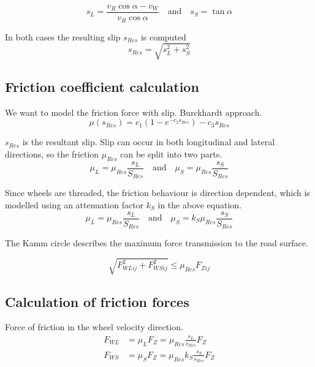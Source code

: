 \begin{equation}
  s_L = \frac{v_R \cos{\alpha} - v_W}{v_R \cos{\alpha}}
  \quad \text{and} \quad
  s_S = \tan{\alpha}
\end{equation}

In both cases the resulting slip $s_{Res}$ is computed 
\begin{equation}
  s_{Res} = \sqrt{s_L^2 + s_S^2}
\end{equation}


\subsection{Friction coefficient calculation}

We want to model the friction force with slip. 
Burckhardt approach.
\begin{equation}
    \mu(s_{Res}) = c_1 \left( 1 - e^{-c_2 s_{Res}} \right) - c_3 s_{Res}
\end{equation}

$s_{Res}$ is the resultant slip. Slip can occur in both longitudinal and lateral directions, so the friction $\mu_{Res}$ can be split into two parts.
\begin{equation}
  \mu_L = \mu_{Res}\frac{s_L}{S_{Res}} 
  \quad \text{and} \quad
  \mu_S = \mu_{Res}\frac{s_S}{S_{Res}} 
\end{equation}

Since wheels are threaded, the friction behaviour is direction dependent, which is modelled using an attenuation factor $k_S$ in the above equation.
\begin{equation}
  \mu_L = \mu_{Res}\frac{s_L}{S_{Res}} 
  \quad \text{and} \quad
  \mu_S = k_S \mu_{Res} \frac{s_S}{S_{Res}} 
\end{equation}

The Kamm circle describes the maximum force transmission to the road surface.

\begin{equation}
  \sqrt{F_{WLij}^2 + F_{WSij}^2} \leq \mu_{Res} F_{Zij}
\end{equation}


\subsection{Calculation of friction forces}

Force of friction in the wheel velocity direction.
\begin{align*}
  F_{WL} &= \mu_L F_Z = \mu_{Res} \frac{s_L}{s_{Res}} F_Z \\ 
  F_{WS} &= \mu_S F_Z = \mu_{Res} k_S \frac{s_S}{s_{Res}} F_Z
\end{align*}


